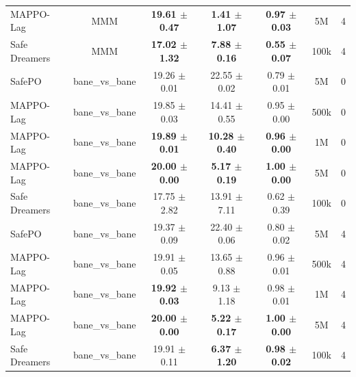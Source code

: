 \documentclass{article}
\begin{document}
\begin{longtable}{lcccccc}
MAPPO-Lag & MMM & \textbf{19.61 $\pm$ 0.47} & \textbf{1.41 $\pm$ 1.07} & \textbf{0.97 $\pm$ 0.03} & 5M & 4 \\
Safe Dreamers & MMM & \textbf{17.02 $\pm$ 1.32} & \textbf{7.88 $\pm$ 0.16} & \textbf{0.55 $\pm$ 0.07} & 100k & 4 \\
\midrule
SafePO & bane\_vs\_bane & 19.26 $\pm$ 0.01 & 22.55 $\pm$ 0.02 & 0.79 $\pm$ 0.01 & 5M & 0 \\
MAPPO-Lag & bane\_vs\_bane & 19.85 $\pm$ 0.03 & 14.41 $\pm$ 0.55 & 0.95 $\pm$ 0.00 & 500k & 0 \\
MAPPO-Lag & bane\_vs\_bane & \textbf{19.89 $\pm$ 0.01} & \textbf{10.28 $\pm$ 0.40} & \textbf{0.96 $\pm$ 0.00} & 1M & 0 \\
MAPPO-Lag & bane\_vs\_bane & \textbf{20.00 $\pm$ 0.00} & \textbf{5.17 $\pm$ 0.19} & \textbf{1.00 $\pm$ 0.00} & 5M & 0 \\
Safe Dreamers & bane\_vs\_bane & 17.75 $\pm$ 2.82 & 13.91 $\pm$ 7.11 & 0.62 $\pm$ 0.39 & 100k & 0 \\
\midrule
SafePO & bane\_vs\_bane & 19.37 $\pm$ 0.09 & 22.40 $\pm$ 0.06 & 0.80 $\pm$ 0.02 & 5M & 4 \\
MAPPO-Lag & bane\_vs\_bane & 19.91 $\pm$ 0.05 & 13.65 $\pm$ 0.88 & 0.96 $\pm$ 0.01 & 500k & 4 \\
MAPPO-Lag & bane\_vs\_bane & \textbf{19.92 $\pm$ 0.03} & 9.13 $\pm$ 1.18 & 0.98 $\pm$ 0.01 & 1M & 4 \\
MAPPO-Lag & bane\_vs\_bane & \textbf{20.00 $\pm$ 0.00} & \textbf{5.22 $\pm$ 0.17} & \textbf{1.00 $\pm$ 0.00} & 5M & 4 \\
Safe Dreamers & bane\_vs\_bane & 19.91 $\pm$ 0.11 & \textbf{6.37 $\pm$ 1.20} & \textbf{0.98 $\pm$ 0.02} & 100k & 4 \\
\end{longtable}
\end{document}
